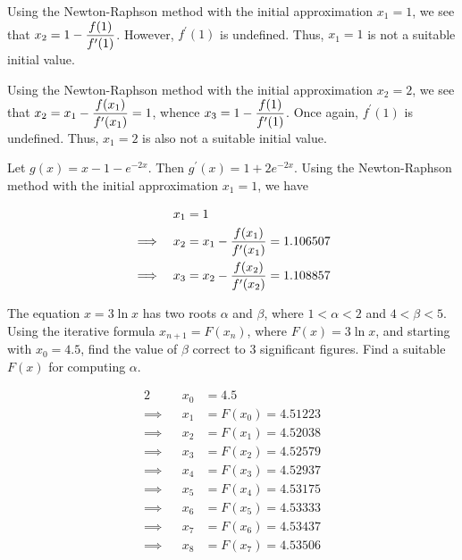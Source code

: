\documentclass{echw}
\begin{document}
            Using the Newton-Raphson method with the initial approximation $x_1 = 1$, we see that $x_2 = 1 - \dfrac{f(1)}{f^\prime(1)}$. However, $f^\prime(1)$ is undefined. Thus, $x_1 = 1$ is not a suitable initial value.

            Using the Newton-Raphson method with the initial approximation $x_2 = 2$, we see that $x_2 = x_1 - \dfrac{f(x_1)}{f^\prime(x_1)} = 1$, whence $x_3 = 1 - \dfrac{f(1)}{f^\prime(1)}$. Once again, $f^\prime(1)$ is undefined. Thus, $x_1 = 2$ is also not a suitable initial value.

            Let $g(x) = x-1-e^{-2x}$. Then $g^\prime(x) = 1+2e^{-2x}$. Using the Newton-Raphson method with the initial approximation $x_1=1$, we have

            \begin{alignat*}{2}
                && x_1 &= 1 \\
                \implies&&x_2 &= x_1 - \dfrac{f(x_1)}{f^\prime(x_1)} = 1.106507 \\
                \implies&&x_3 &= x_2 - \dfrac{f(x_2)}{f^\prime(x_2)} = 1.108857
            \end{alignat*}

            

    \problem{}
        The equation $x = 3\ln x$ has two roots $\alpha$ and $\beta$, where $1 < \alpha < 2$ and $4 < \beta < 5$. Using the iterative formula $x_{n+1} = F(x_n)$, where $F(x) = 3 \ln x$, and starting with $x_0 = 4.5$, find the value of $\beta$ correct to 3 significant figures. Find a suitable $F(x)$ for computing $\alpha$.

    \solution
        \begin{alignat*}{2}
            && x_0 &= 4.5 \\
            \implies&&x_1 &= F(x_0) = 4.51223 \\
            \implies&&x_2 &= F(x_1) = 4.52038 \\
            \implies&&x_3 &= F(x_2) = 4.52579 \\
            \implies&&x_4 &= F(x_3) = 4.52937 \\
            \implies&&x_5 &= F(x_4) = 4.53175 \\
            \implies&&x_6 &= F(x_5) = 4.53333 \\
            \implies&&x_7 &= F(x_6) = 4.53437 \\
            \implies&&x_8 &= F(x_7) = 4.53506
        \end{alignat*}

\end{document}
